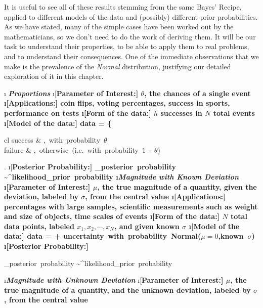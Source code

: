 It is useful to see all of these results stemming from the same Bayes' Recipe, applied to different models of the data and (possibly) different prior probabilities.  As we have stated, many of the simple cases have been worked out by the mathematicians, so we don't need to do the work of deriving them.  It will be our task to understand their properties, to be able to apply them to real problems, and to understand their consequences.  One of the immediate observations that we make is the prevalence of the {\em Normal} distribution, justifying our detailed exploration of it in this chapter.

\newcommand{\postlikeprior}[3]{
	\beqn \underbrace{#1}_{\rm posterior\ probability} \sim \overbrace{#2}^{\rm likelihood}\times \underbrace{#3}_{\rm prior\ probability}
	\eeqn
}

\be
\i {\textbf{\textit{ Proportions}}}
	\bi
	\i[\bf Parameter of Interest:] $\theta$, the chances of a single event
	\i[\bf Applications:] coin flips, voting percentages, success in sports, performance on tests
	\i[\bf Form of the data:] $h$ successes in $N$ total events
	\i[\bf Model of the data:] 
	\beqn
	{\rm data} = \left\{\begin{array}{cl}
			{\rm success} & \mbox{, with probability $\theta$} \\
			{\rm failure} & \mbox{, otherwise (i.e. with probability $1-\theta$})
			\end{array}\right.
	\eeqn
	\i[\bf Posterior Probability:]
	\beqn {}_{\rm posterior\ probability} \sim {}^{\rm likelihood}\times {}_{\rm prior\ probability}
	\eeqn
	\ei
\i {\textbf{\textit{Magnitude with Known Deviation}}}	\bi
	\i[\bf Parameter of Interest:] $\mu$, the true magnitude of a quantity, given the deviation, labeled by $\sigma$, from the central value
	\i[\bf Applications:] percentages with large samples, scientific measurements such as weight and size of objects, time scales of events
	\i[\bf Form of the data:] $N$ total data points, labeled $x_{1}, x_{2}, \cdots, x_{N}$, and given known $\sigma$
	\i[\bf Model of the data:] 
	\beqn
	{\rm data} = \mu + \mbox{uncertainty with probability Normal($\mu=0$,known $\sigma$)}
	\eeqn
	\i[\bf Posterior Probability:]
	\postlikeprior{{\rm Normal}(\mu_{2}|{\rm data},\sigma)}{{\rm Normal}({\rm data}|\mu,\sigma)}{{\rm Uniform}(\mu)}
	\ei
\i {\textbf{\textit{Magnitude with Unknown Deviation}}}	\bi
	\i[\bf Parameter of Interest:] $\mu$, the true magnitude of a quantity, and the unknown deviation, labeled by $\sigma$, from the central value
